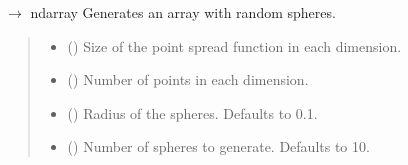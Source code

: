 \documentclass[letterpaper,10pt,english]{sphinxmanual}
\begin{document}

\begin{fulllineitems}
\label{\detokenize{source/ShapesGenerator:ShapesGenerator.generate_random_spherical_particles}}
\pysigstartsignatures
\pysiglinewithargsret
{}
{\sphinxparamcomma {}\sphinxparamcomma {}\sphinxparamcomma {}\sphinxparamcomma {}}
{{ $\rightarrow$ ndarray}}
\pysigstopsignatures
\sphinxAtStartPar
Generates an array with random spheres.
\begin{quote}\begin{description}
\begin{itemize}
\item {} 
\sphinxAtStartPar
{} (\sphinxstyleliteralemphasis{\sphinxupquote{{[}}}\sphinxstyleliteralemphasis{\sphinxupquote{, }}\sphinxstyleliteralemphasis{\sphinxupquote{, }}\sphinxstyleliteralemphasis{\sphinxupquote{{]}}}) \textendash{} Size of the point spread function in each dimension.

\item {} 
\sphinxAtStartPar
{} () \textendash{} Number of points in each dimension.

\item {} 
\sphinxAtStartPar
{} (\sphinxstyleliteralemphasis{\sphinxupquote{, }}) \textendash{} Radius of the spheres. Defaults to 0.1.

\item {} 
\sphinxAtStartPar
{} (\sphinxstyleliteralemphasis{\sphinxupquote{, }}) \textendash{} Number of spheres to generate. Defaults to 10.


\end{itemize}
\end{description}
\end{quote}
\end{fulllineitems}
\end{document}
